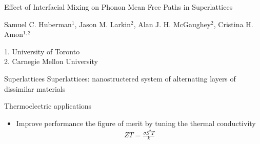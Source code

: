 \documentclass{beamer}
\begin{document}
\begin{frame}
\Large{Effect of Interfacial Mixing on Phonon Mean Free Paths in Superlattices}

\small{Samuel C. Huberman$^1$, Jason M. Larkin$^2$, Alan J. H. McGaughey$^2$, Cristina H. Amon$^{1,2}$}\\

\date{
	\\
	\vspace{1cm}
	\today
}
\vspace{1cm}
\tiny{1. University of Toronto}\\
\tiny{2. Carnegie Mellon University}
\end{frame}

\begin{frame}{Superlattices}
Superlattices: nanostructered system of alternating layers of dissimilar materials
\begin{figure}[t]
\begin{center}
\renewcommand{\figure}{Fig.}
\end{center}
\end{figure}

Thermoelectric applications
\begin{itemize}
\item Improve performance the figure of merit by tuning the thermal conductivity
\begin{equation}\label{EQ:NMD:qdot}
\begin{split}
ZT=\frac{\sigma S^2 T}{k}
\end{split}
\end{equation}
\end{itemize}
\end{frame}
\end{document}
